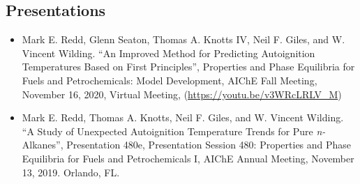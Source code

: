 \hypertarget{presentations}{%
\subsection{Presentations}\label{presentations}}

\begin{itemize}
\tightlist
\item
  Mark E. Redd, Glenn Seaton, Thomas A. Knotts IV, Neil F. Giles, and W.
  Vincent Wilding. ``An Improved Method for Predicting Autoignition
  Temperatures Based on First Principles'', Properties and Phase
  Equilibria for Fuels and Petrochemicals: Model Development, AIChE Fall
  Meeting, November 16, 2020, Virtual Meeting,
  (\url{https://youtu.be/v3WRcLRLV_M})
\item
  Mark E. Redd, Thomas A. Knotts, Neil F. Giles, and W. Vincent Wilding.
  ``A Study of Unexpected Autoignition Temperature Trends for Pure
  \emph{n-}Alkanes'', Presentation 480e, Presentation Session 480:
  Properties and Phase Equilibria for Fuels and Petrochemicals I, AIChE
  Annual Meeting, November 13, 2019. Orlando, FL.
\end{itemize}
